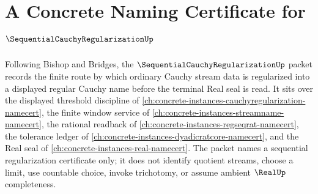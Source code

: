 \chapter{A Concrete Naming Certificate for $\SequentialCauchyRegularizationUp$}
\label{ch:concrete-instances-sequential-cauchy-regularization-namecert}

Following Bishop and Bridges, the $\SequentialCauchyRegularizationUp$ packet records the finite route by which ordinary Cauchy stream data is regularized into a displayed regular Cauchy name before the terminal Real seal is read. It sits over the displayed threshold discipline of \autoref{ch:concrete-instances-cauchyregularization-namecert}, the finite window service of \autoref{ch:concrete-instances-streamname-namecert}, the rational readback of \autoref{ch:concrete-instances-regseqrat-namecert}, the tolerance ledger of \autoref{ch:concrete-instances-dyadicratcore-namecert}, and the Real seal of \autoref{ch:concrete-instances-real-namecert}. The packet names a sequential regularization certificate only; it does not identify quotient streams, choose a limit, use countable choice, invoke trichotomy, or assume ambient $\RealUp$ completeness.


